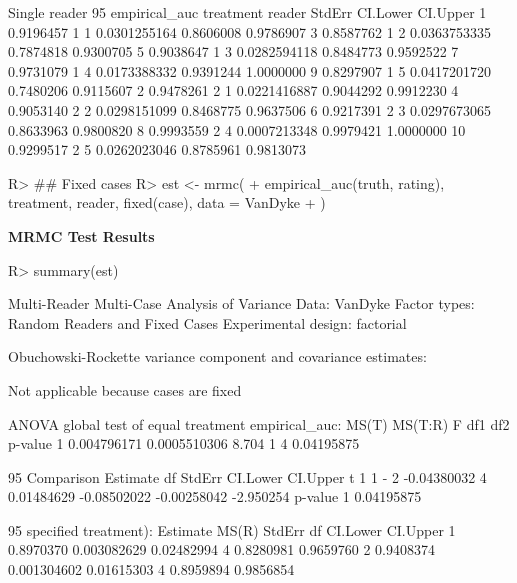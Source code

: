 \documentclass[
]{jss}
\begin{document}
\begin{CodeChunk}
\begin{CodeOutput}
Single reader 95%
   empirical_auc treatment reader       StdErr  CI.Lower  CI.Upper
1      0.9196457         1      1 0.0301255164 0.8606008 0.9786907
3      0.8587762         1      2 0.0363753335 0.7874818 0.9300705
5      0.9038647         1      3 0.0282594118 0.8484773 0.9592522
7      0.9731079         1      4 0.0173388332 0.9391244 1.0000000
9      0.8297907         1      5 0.0417201720 0.7480206 0.9115607
2      0.9478261         2      1 0.0221416887 0.9044292 0.9912230
4      0.9053140         2      2 0.0298151099 0.8468775 0.9637506
6      0.9217391         2      3 0.0297673065 0.8633963 0.9800820
8      0.9993559         2      4 0.0007213348 0.9979421 1.0000000
10     0.9299517         2      5 0.0262023046 0.8785961 0.9813073
\end{CodeOutput}
\end{CodeChunk}

\begin{CodeChunk}
\begin{CodeInput}
R> ## Fixed cases
R> est <- mrmc(
+   empirical_auc(truth, rating), treatment, reader, fixed(case), data = VanDyke
+ )
\end{CodeInput}
\end{CodeChunk}

\textbf{MRMC Test Results}

\begin{CodeChunk}
\begin{CodeInput}
R> summary(est)
\end{CodeInput}
\begin{CodeOutput}
Multi-Reader Multi-Case Analysis of Variance
Data: VanDyke
Factor types: Random Readers and Fixed Cases
Experimental design: factorial 

Obuchowski-Rockette variance component and covariance estimates:

Not applicable because cases are fixed


ANOVA global test of equal treatment empirical_auc:
        MS(T)      MS(T:R)     F df1 df2    p-value
1 0.004796171 0.0005510306 8.704   1   4 0.04195875


95%
  Comparison    Estimate df     StdErr    CI.Lower    CI.Upper         t
1      1 - 2 -0.04380032  4 0.01484629 -0.08502022 -0.00258042 -2.950254
     p-value
1 0.04195875


95%
specified treatment):
   Estimate       MS(R)     StdErr df  CI.Lower  CI.Upper
1 0.8970370 0.003082629 0.02482994  4 0.8280981 0.9659760
2 0.9408374 0.001304602 0.01615303  4 0.8959894 0.9856854
\end{CodeOutput}
\end{CodeChunk}
\end{document}
